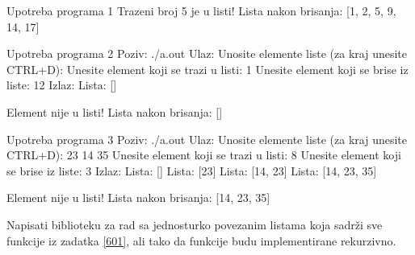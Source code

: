 \begin{Exercise}[label=601]
\begin{enumerate}
\begin{maxitest}
\begin{test}{Upotreba programa 1}
  Trazeni broj 5 je u listi!
  Lista nakon brisanja:  [1, 2, 5, 9, 14, 17]
\end{test}
\end{maxitest}
\begin{maxitest}
\begin{test}{Upotreba programa 2}
Poziv: ./a.out
Ulaz:
  Unosite elemente liste (za kraj unesite CTRL+D): 
  Unesite element koji se trazi u listi: 1
  Unesite element koji se brise iz liste: 12
Izlaz:
  Lista: []
  
  Element nije u listi!
  Lista nakon brisanja:  []
\end{test}
\end{maxitest}
\begin{maxitest}
\begin{test}{Upotreba programa 3}
Poziv: ./a.out
Ulaz:
  Unosite elemente liste (za kraj unesite CTRL+D): 23 14 35
  Unesite element koji se trazi u listi: 8
  Unesite element koji se brise iz liste: 3
Izlaz:
  Lista: []
  Lista: [23]
  Lista: [14, 23]
  Lista: [14, 23, 35]
  
  Element nije u listi!
  Lista nakon brisanja:  [14, 23, 35]
\end{test}
\end{maxitest}
\end{enumerate}

\end{Exercise}
\begin{Answer}[ref=601]
\end{Answer}

\begin{Exercise}[label=602]
Napisati biblioteku za rad sa jednosturko povezanim listama koja sadrži sve funkcije iz zadatka \ref{601}, ali tako da funkcije budu implementirane rekurzivno. 
\end{Exercise}
\begin{Answer}[ref=602]
\end{Answer}

